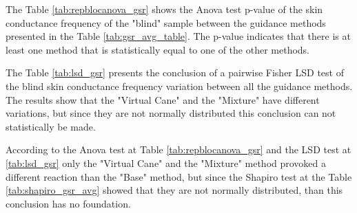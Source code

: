 The Table \ref{tab:repblocanova_gsr} shows the Anova test p-value of the skin conductance frequency of the "blind" sample between the guidance methods presented in the Table \ref{tab:gsr_avg_table}. The p-value indicates that there is at least one method that is statistically equal to one of the other methods.



The Table \ref{tab:lsd_gsr} presents the conclusion of a pairwise Fisher LSD test of the blind skin conductance frequency variation between all the guidance methods. The results show that the "Virtual Cane" and the "Mixture" have different variations, but since they are not normally distributed this conclusion can not statistically be made.



According to the Anova test at Table \ref{tab:repblocanova_gsr} and the LSD test at \ref{tab:lsd_gsr} only the "Virtual Cane" and the "Mixture" method provoked a different reaction than the "Base" method, but since the Shapiro test at the Table \ref{tab:shapiro_gsr_avg} showed that they are not normally distributed, than this conclusion has no foundation.


\FloatBarrier

